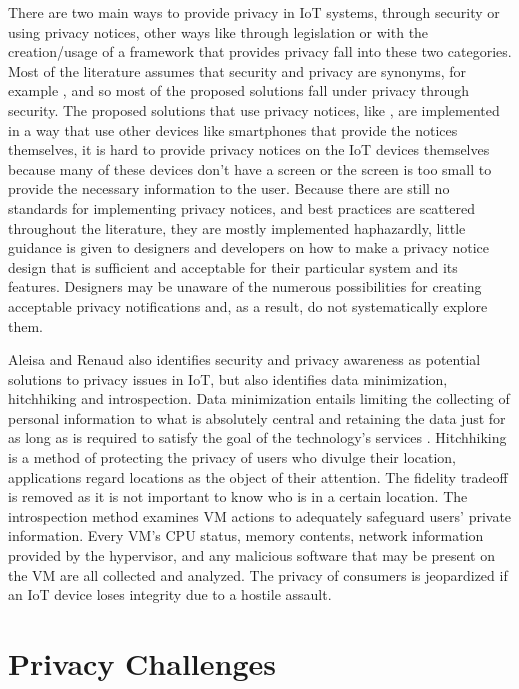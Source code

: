 \documentclass[conference]{IEEEtran}
\begin{document}
There are two main ways to provide privacy in IoT systems, through security
or using privacy notices, other ways like through legislation or with the
creation/usage of a framework that provides privacy fall into these two
categories. Most of the literature assumes that security and privacy are
synonyms, for example \cite{opara2022framework, FabianoInternet, SunSecure},
and so most of the proposed solutions fall under privacy through security.
The proposed solutions that use privacy notices, like \cite{FengDesign}, are
implemented in a way that use other devices like smartphones that provide
the notices themselves, it is hard to provide privacy notices on the IoT devices
themselves because many of these devices don't have a screen or the screen
is too small to provide the necessary information to the user. Because there
are still no standards for implementing privacy notices, and best practices
are scattered throughout the literature, they are mostly implemented haphazardly,
little guidance is given to designers and developers on how to make a privacy
notice design that is sufficient and acceptable for their particular system
and its features. Designers may be unaware of the numerous possibilities for
creating acceptable privacy notifications and, as a result, do not systematically
explore them.

Aleisa and Renaud \cite{aleisa2016privacy} also identifies security and privacy
awareness as potential solutions to privacy issues in IoT, but also identifies
data minimization, hitchhiking and introspection. Data minimization entails
limiting the collecting of personal information to what is absolutely central
and retaining the data just for as long as is required to satisfy the goal
of the technology's services \cite{ojDirective281}. Hitchhiking \cite{tang2006putting}
is a method of protecting the privacy of users who divulge their location,
applications regard locations as the object of their attention. The fidelity
tradeoff is removed as it is not important to know who is in a certain
location. The introspection \cite{kang2015protection} method examines VM
actions to adequately safeguard users' private information. Every VM's
CPU status, memory contents, network information provided by the hypervisor,
and any malicious software that may be present on the VM are all collected
and analyzed. The privacy of consumers is jeopardized if an IoT device
loses integrity due to a hostile assault.

\section{Privacy Challenges}
\end{document}
